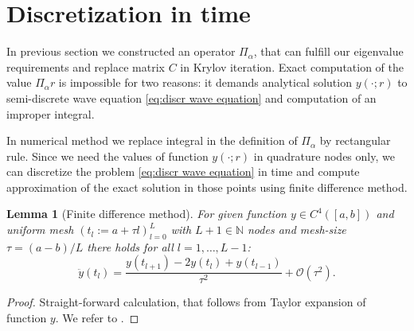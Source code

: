 \documentclass[a4paper,11pt,bibliography=totoc,listof=totoc,headinclude=true,cleardoublepage=empty,oneside]{scrbook}
\newtheorem{lemma}[theorem]{Lemma}
\newcommand{\N}{\mathbb{N}}
\newcommand{\bigO}{\mathcal{O}}
\begin{document}
\section{Discretization in time}
In previous section we constructed an operator $\Pi_\alpha$, that can fulfill our eigenvalue requirements and replace matrix $C$ in Krylov iteration. Exact computation of the value $\Pi_\alpha r$ is impossible for two reasons: it demands analytical solution $y(\cdot; r)$ to semi-discrete wave equation \eqref{eq:discr wave equation} and computation of an improper integral. 

In numerical method we replace integral in the definition of $\Pi_\alpha$ by rectangular rule. Since we need the values of function $y(\cdot; r)$ in quadrature nodes only, we can discretize the problem \eqref{eq:discr wave equation} in time and compute approximation of the exact solution in those points using finite difference method. 
\begin{lemma}[Finite difference method]\label{lemma:finite diffs}
    For given function $y \in C^4 ([a, b])$ and uniform mesh $(t_l := a+\tau l)_{l=0}^{L}$ with $L+1\in\N$ nodes and mesh-size $\tau = (a-b)/L$ there holds for all $l=1, \dots, L-1$:
    \begin{equation*}
        \ddot{y}(t_l) = \frac{y(t_{l+1}) - 2 y(t_l) + y(t_{l-1})}{\tau^2} + \bigO(\tau^2).
    \end{equation*}
\end{lemma}
\begin{proof}
    Straight-forward calculation, that follows from Taylor expansion of function $y$. We refer to \cite[p. 93]{numodes}.
\end{proof}
\end{document}
